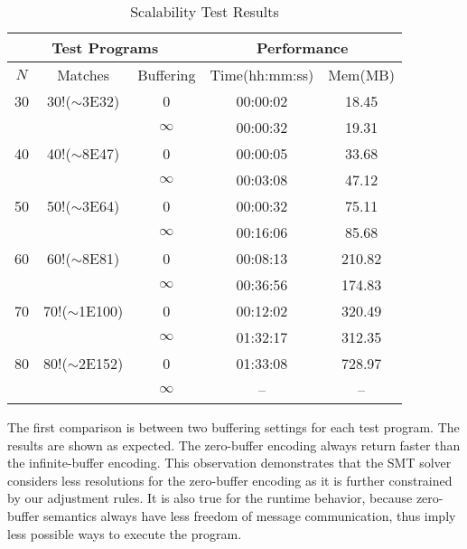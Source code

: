 \begin{table}[t]
\begin{center}
\scriptsize
\caption{Scalability Test Results}\label{table:scalability}
\begin{tabular}{|c|c|c|c|c|}
		\hline
         \multicolumn{3}{|c|}{Test Programs} & \multicolumn{2}{|c|}{Performance} \\ \hline
          $\mathit{N}$ & Matches & Buffering  & Time(hh:mm:ss) & Mem(MB) \\ \hline
          30 & 30!($\sim$3E32) & 0 & 00:00:02 & 18.45\\
               & & $\infty$ & 00:00:32 & 19.31 \\ \hline
          40 & 40!($\sim$8E47) & 0 & 00:00:05 & 33.68\\
               &  & $\infty$ & 00:03:08 & 47.12 \\ \hline
          50 & 50!($\sim$3E64) & 0 & 00:00:32 & 75.11\\
               & & $\infty$ & 00:16:06 & 85.68\\ \hline
          60 & 60!($\sim$8E81) & 0 & 00:08:13 & 210.82\\
               &  & $\infty$ & 00:36:56 & 174.83\\ \hline
          70 & 70!($\sim$1E100) & 0 & 00:12:02 & 320.49\\
               & & $\infty$ & 01:32:17 & 312.35\\ \hline
          80 & 80!($\sim$2E152) & 0 & 01:33:08 & 728.97\\
               & & $\infty$ & -- & --\\ \hline         
		\end{tabular}
\end{center}
\end{table}
The first comparison is between two buffering settings for each test program. The results are shown as expected. The zero-buffer encoding always return faster than the infinite-buffer encoding. This observation demonstrates that the SMT solver considers less resolutions for the zero-buffer encoding as it is further constrained by our adjustment rules. It is also true for the runtime behavior, because zero-buffer semantics always have less freedom of message communication, thus imply less possible ways to execute the program. 

